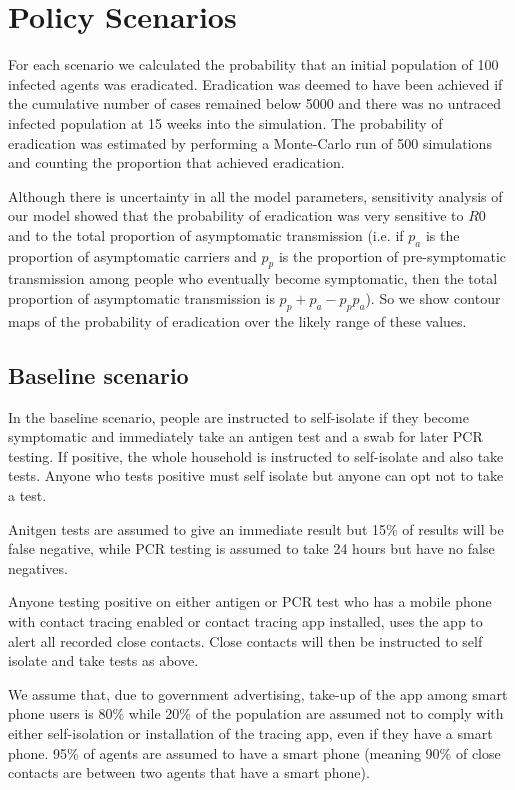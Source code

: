 \documentclass{article}
\begin{document}
\section{Policy Scenarios}

For each scenario we calculated the probability that an initial population of 100 infected agents was eradicated. Eradication was deemed to have been achieved if the cumulative number of cases remained below 5000 and there was no untraced infected population at 15 weeks into the simulation. The probability of eradication was estimated by performing a Monte-Carlo run of 500 simulations and counting the proportion that achieved eradication.

Although there is uncertainty in all the model parameters, sensitivity analysis of our model showed that the probability of eradication was very sensitive to $R0$ and to the total proportion of asymptomatic transmission (i.e. if $p_a$ is the proportion of asymptomatic carriers and $p_p$ is the proportion of pre-symptomatic transmission among people who eventually become symptomatic, then the total proportion of asymptomatic transmission is $p_p + p_a - p_pp_a$). So we show contour maps of the probability of eradication over the likely range of these values.

\subsection{Baseline scenario}

In the baseline scenario, people are instructed to self-isolate if they become symptomatic and immediately take an antigen test and a swab for later PCR testing. If positive, the whole household is instructed to self-isolate and also take tests. Anyone who tests positive must self isolate but anyone can opt not to take a test.

Anitgen tests are assumed to give an immediate result but 15\% of results will be false negative, while PCR testing is assumed to take 24 hours but have no false negatives.

Anyone testing positive on either antigen or PCR test who has a mobile phone with contact tracing enabled or contact tracing app installed, uses the app to alert all recorded close contacts. Close contacts will then be instructed to self isolate and take tests as above.

We assume that, due to government advertising, take-up of the app among smart phone users is 80\% while 20\% of the population are assumed not to comply with either self-isolation or installation of the tracing app, even if they have a smart phone.  95\% of agents are assumed to have a smart phone (meaning 90\% of close contacts are between two agents that have a smart phone).
\end{document}
